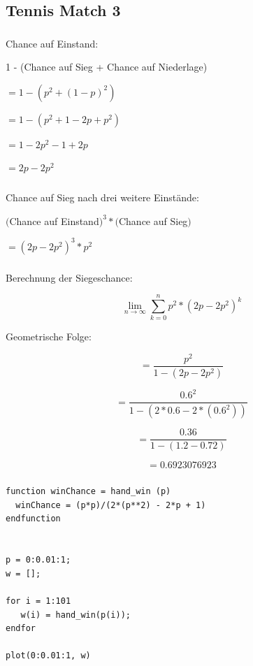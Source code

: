 \documentclass{article}
\begin{document}
\subsection{Tennis Match 3}

\subsubsection{}
Chance auf Einstand:

1 - (Chance auf Sieg + Chance auf Niederlage)

$= 1 - (p^2 + (1-p)^2)$

$= 1 - (p^2 + 1 - 2p + p^2)$

$= 1 - 2p^2 - 1 + 2p$

$= 2p - 2p^2$

\subsubsection{}
Chance auf Sieg nach drei weitere Einstände:

$($Chance auf Einstand$)^3 * ($Chance auf Sieg$)$

$= (2p - 2p^2)^3 * p^2$

\subsubsection{}
Berechnung der Siegeschance:

$$\lim_{n\to\infty} \sum_{k=0}^{n} p^2 * (2p-2p^2)^k$$

Geometrische Folge:

\[=\frac{p^2}{1-(2p-2p^2)}\]

\[=\frac{0.6^2}{1-(2*0.6-2*(0.6^2))}\]

\[=\frac{0.36}{1-(1.2-0.72)}\]

\[=0.6923076923\]

\subsubsection{}

\begin{lstlisting}
function winChance = hand_win (p)
  winChance = (p*p)/(2*(p**2) - 2*p + 1)
endfunction


p = 0:0.01:1;
w = [];

for i = 1:101
   w(i) = hand_win(p(i));
endfor

plot(0:0.01:1, w)
\end{lstlisting}
\end{document}
